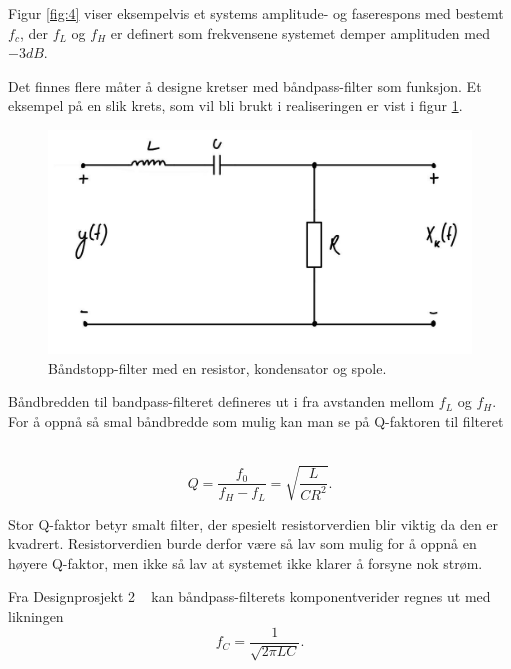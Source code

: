 \documentclass[a4paper,11pt,norsk]{article}
\begin{document}
Figur \ref{fig:4} viser eksempelvis et systems amplitude- og faserespons med bestemt $f_c$, der $f_L$ og $f_H$ er definert som frekvensene systemet demper amplituden med $-3 dB$.

Det finnes flere måter å designe kretser med båndpass-filter som funksjon. Et eksempel på en slik krets, som vil bli brukt i realiseringen er vist i figur \ref{fig:5}.

\begin{figure}[H]
  \centering
  \includegraphics[scale=0.4]{D1/Images/bandpass.jpg}
  \caption{Båndstopp-filter med en resistor, kondensator og spole.}
  \label{fig:5}
\end{figure}

Båndbredden til bandpass-filteret defineres ut i fra avstanden mellom $f_L$ og $f_H$. For å oppnå så smal båndbredde som mulig kan man se på Q-faktoren til filteret ~\cite[Kva er eit “smalt” bandpassfilter?, s. 2)]{notat}

\begin{equation*}
    Q = \frac{f_0}{f_H-f_L} = \sqrt{\frac{L}{CR^2}}.
\end{equation*}

Stor Q-faktor betyr smalt filter, der spesielt resistorverdien blir viktig da den er kvadrert. Resistorverdien burde derfor være så lav som mulig for å oppnå en høyere Q-faktor, men ikke så lav at systemet ikke klarer å forsyne nok strøm.

Fra Designprosjekt 2 ~\cite[Prinsipiell løsning, s. 4)]{D2} kan  båndpass-filterets komponentverider regnes ut med likningen
\begin{equation}
    \label{eq:senterfrekvens}
    f_C = \frac{1}{\sqrt{2\pi LC}}.
\end{equation}
\end{document}
